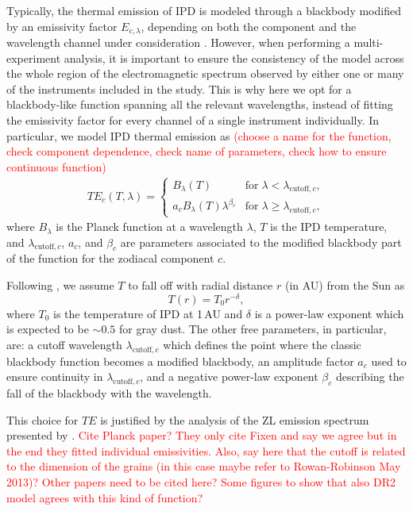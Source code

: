 \documentclass{aa}
\newcommand{\angela}[0]{\textcolor{red}}
\begin{document}
Typically, the thermal emission of IPD is modeled through a blackbody modified by 
an emissivity factor $E_{c,\lambda}$, depending on both the component and the 
wavelength channel under consideration \citep{kelsall1998}. However, when performing 
a multi-experiment analysis, it is important to ensure the consistency of the model 
across the whole region of the electromagnetic spectrum observed by either one or 
many of the instruments included in the study. This is why here we opt for a 
blackbody-like function spanning all the relevant wavelengths, instead of fitting the 
emissivity factor for every channel of a single instrument individually. In 
particular, we model IPD thermal emission as 
\angela{(choose a name for the function, check component dependence, check name of parameters, 
check how to ensure continuous function)}
\begin{align}
    TE_c(T, \lambda)= \begin{cases}
        B_\lambda(T) & \mathrm{for}\; \lambda < \lambda_{\mathrm{cutoff}, c},\\
        a_c B_\lambda(T) \lambda^{\beta_c} & \mathrm{for}\; \lambda \geq \lambda_{\mathrm{cutoff}, c},
    \end{cases}
    \label{eq:emission}
\end{align}
where $B_\lambda$ is the Planck function at a wavelength $\lambda$, $T$ is the 
IPD temperature, and $\lambda_{\mathrm{cutoff}, c}$, $a_c$, and $\beta_c$ are 
parameters associated to the modified blackbody part of the function for the 
zodiacal component $c$. 

Following \citet{kelsall1998}, we assume $T$ to fall off with radial distance $r$ (in AU)
from the Sun as
\begin{equation}
    T(r) = T_0 r^{-\delta},
\end{equation}
where $T_0$ is the temperature of IPD at 1\,AU and $\delta$ is a power-law 
exponent which is expected to be $\sim 0.5$ for gray dust. The other free parameters, 
in particular, are: a cutoff wavelength $\lambda_{\mathrm{cutoff}, c}$ which defines 
the point where the classic blackbody function becomes a modified blackbody, 
an amplitude factor $a_c$ used to ensure continuity in $\lambda_{\mathrm{cutoff}, c}$, 
and a negative power-law exponent $\beta_c$ describing the fall of the blackbody 
with the wavelength.

This choice for $TE$ is justified by the analysis of the ZL emission spectrum 
presented by \citet{Fixsen2002}. \angela{Cite Planck paper? They only cite Fixen and say 
we agree but in the end they fitted individual emissivities. Also, say here that 
the cutoff is related to the dimension of the grains (in this case maybe refer to 
Rowan-Robinson May 2013)? Other papers need to be cited here? Some figures to 
show that also DR2 model agrees with this kind of function?}
\end{document}
